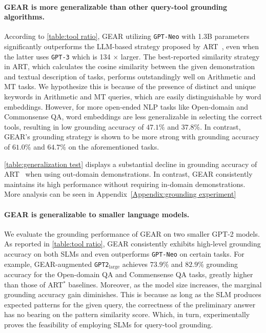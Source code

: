 \documentclass[11pt]{article}
\newcommand{\daniel}[1]{{\color{purple}[DK: #1]}}
\newcommand{\yining}[1]{{\color{ForestGreen}[YL: #1]}}
\newcommand{\llm}{\textcolor{darkredTwo}{LLM}}
\newcommand{\slm}{\textcolor{darkblueTwo}{SLM}}
\newcommand{\name}{{\fontfamily{cmss}\selectfont GEAR}}
\newcommand{\gptNeo}{{\tt \textcolor{darkblueTwo}{GPT-Neo}}}
\newcommand{\gptTwoLarge}{{\tt \textcolor{darkblueTwo}{GPT2$_{\text{large}}$}}}
\newcommand{\gptThree}{{\tt \textcolor{darkredTwo}{GPT-3}}}
\begin{document}
\paragraph{\name{} is more generalizable than other query-tool grounding algorithms.} 
According to \autoref{table:tool ratio}, \name{} utilizing \gptNeo{} with 1.3B parameters significantly outperforms the \llm{}-based strategy proposed by ART~\citep{paranjape2023art}, even when the latter uses \gptThree{} which is 134 $\times$ larger. The best-reported similarity strategy in ART, which calculates the cosine similarity between the given demonstration and textual description of tasks, performs outstandingly well on Arithmetic and MT tasks. We hypothesize this is because of the presence of distinct and unique keywords in Arithmetic and MT queries, which are easily distinguishable by word embeddings. However, for more open-ended NLP tasks like Open-domain and Commonsense QA, word embeddings are less generalizable in selecting the correct tools, resulting in low grounding accuracy of $47.1\%$ and $37.8\%$. In contrast, \name's grounding strategy is shown to be more strong with grounding accuracy of $61.0\%$ and $64.7\%$ on the aforementioned tasks.

\autoref{table:generalization test} displays a substantial decline in grounding accuracy of ART~\citep{paranjape2023art} when using out-domain demonstrations. In contrast, \name{} consistently maintains its high performance without requiring in-domain demonstrations. More analysis can be seen in Appendix~\ref{Appendix:grounding experiment}

\paragraph{\name{} is generalizable to smaller language models.} We evaluate the grounding performance of \name{} on two smaller GPT-2 models. As reported in \autoref{table:tool ratio}, \name{} consistently exhibits high-level grounding accuracy on both \slm{}s and even outperforms \gptNeo{} on certain tasks. For example, \name{}-augmented \gptTwoLarge{} achieves $73.9\%$ and $82.9\%$ grounding accuracy for the Open-domain QA and Commensense QA tasks, greatly higher than those of ART$^\ast$ baselines. Moreover, as the model size increases, the marginal grounding accuracy gain diminishes. This is because as long as the \slm{} produces expected patterns for the given query, the correctness of the preliminary answer has no bearing on the pattern similarity score. Which, in turn, experimentally proves the feasibility of employing \slm{}s for query-tool grounding. 
\end{document}
